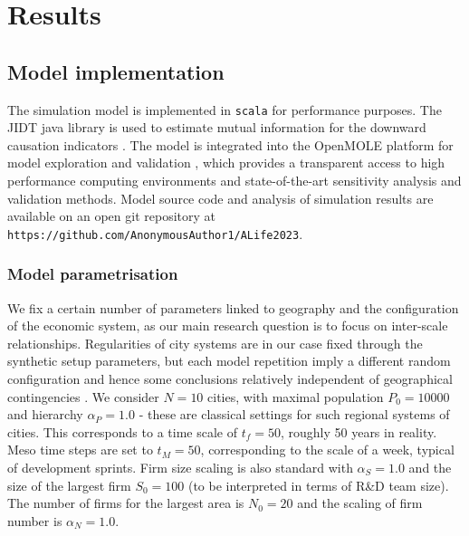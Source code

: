 \documentclass[letterpaper]{article}
\begin{document}
\section{Results}


\subsection{Model implementation}

The simulation model is implemented in \texttt{scala} for performance purposes. The JIDT java library is used to estimate mutual information for the downward causation indicators \citep{lizier2014jidt}. The model is integrated into the OpenMOLE platform for model exploration and validation \citep{reuillon2013openmole}, which provides a transparent access to high performance computing environments and state-of-the-art sensitivity analysis and validation methods. Model source code and analysis of simulation results are available on an open git repository at \texttt{https://github.com/AnonymousAuthor1/ALife2023}.


\subsubsection{Model parametrisation}



We fix a certain number of parameters linked to geography and the configuration of the economic system, as our main research question is to focus on inter-scale relationships. Regularities of city systems are in our case fixed through the synthetic setup parameters, but each model repetition imply a different random configuration and hence some conclusions relatively independent of geographical contingencies \cite{raimbault2019space}. We consider $N=10$ cities, with maximal population $P_0 = 10000$ and hierarchy $\alpha_P = 1.0$ - these are classical settings for such regional systems of cities. This corresponds to a time scale of $t_f = 50$, roughly 50 years in reality. Meso time steps are set to $t_M=50$, corresponding to the scale of a week, typical of development sprints. Firm size scaling is also standard with $\alpha_S = 1.0$ and the size of the largest firm $S_0 = 100$ (to be interpreted in terms of R\&D team size). The number of firms for the largest area is $N_0 = 20$ and the scaling of firm number is $\alpha_N = 1.0$.
\end{document}

